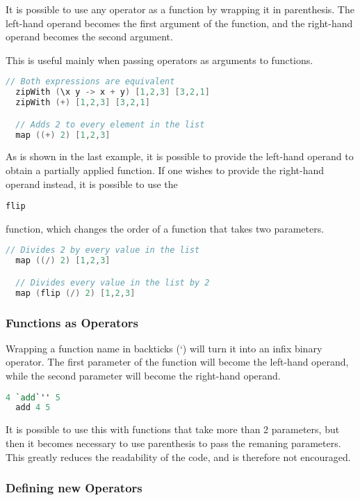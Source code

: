 \documentclass{article}
\def\code#1{\begin{footnotesize}\texttt{#1}\end{footnotesize}}
\begin{document}
It is possible to use any operator as a function by wrapping it in parenthesis.
The left-hand operand becomes the first argument of the function, and the right-hand operand becomes the second argument.

This is useful mainly when passing operators as arguments to functions.

\begin{lstlisting}[language=V]
  // Both expressions are equivalent
  zipWith (\x y -> x + y) [1,2,3] [3,2,1]
  zipWith (+) [1,2,3] [3,2,1]

  // Adds 2 to every element in the list
  map ((+) 2) [1,2,3]
\end{lstlisting}

As is shown in the last example, it is possible to provide the left-hand operand to obtain a partially applied function.
If one wishes to provide the right-hand operand instead, it is possible to use the \code{flip} function, which changes the order of a function that takes two parameters.

\begin{lstlisting}[language=V]
  // Divides 2 by every value in the list
  map ((/) 2) [1,2,3]

  // Divides every value in the list by 2
  map (flip (/) 2) [1,2,3]
\end{lstlisting}

\subsubsection{Functions as Operators}

Wrapping a function name in backticks (\lq) will turn it into an infix binary operator.
The first parameter of the function will become the left-hand operand, while the second parameter will become the right-hand operand.

\begin{lstlisting}[language=V, escapechar=']
  4 `add`'' 5
  add 4 5
\end{lstlisting}

It is possible to use this with functions that take more than 2 parameters, but then it becomes necessary to use parenthesis to pass the remaning parameters.
This greatly reduces the readability of the code, and is therefore not encouraged.

\subsubsection{Defining new Operators}
\end{document}
